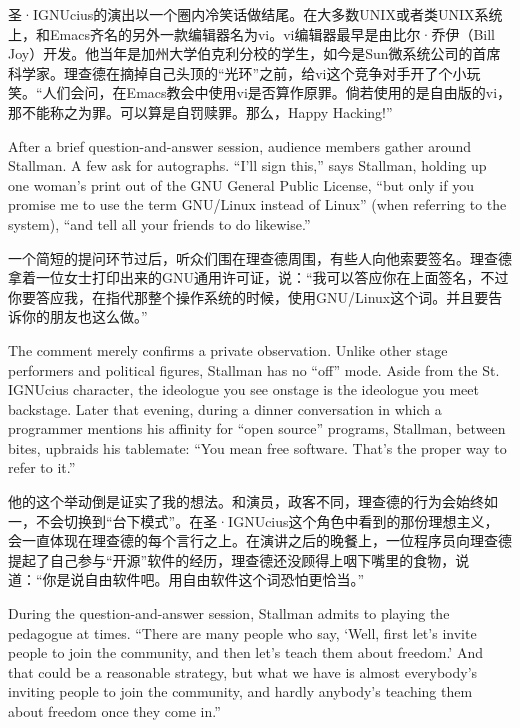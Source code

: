\ifdefined\chs
圣·IGNUcius的演出以一个圈内冷笑话做结尾。在大多数UNIX或者类UNIX系统上，和Emacs齐名的另外一款编辑器名为vi。vi编辑器最早是由比尔·乔伊（Bill Joy）开发。他当年是加州大学伯克利分校的学生，如今是Sun微系统公司的首席科学家。理查德在摘掉自己头顶的``光环''之前，给vi这个竞争对手开了个小玩笑。``人们会问，在Emacs教会中使用vi是否算作原罪。倘若使用的是自由版的vi，那不能称之为罪。可以算是自罚赎罪。那么，Happy Hacking!''
\fi

\ifdefined\eng
After a brief question-and-answer session, audience members gather around Stallman. A few ask for autographs. ``I'll sign this,'' says Stallman, holding up one woman's print out of the GNU General Public License, ``but only if you promise me to use the term GNU/Linux instead of Linux'' (when referring to the system), ``and tell all your friends to do likewise.''
\fi

\ifdefined\chs
一个简短的提问环节过后，听众们围在理查德周围，有些人向他索要签名。理查德拿着一位女士打印出来的GNU通用许可证，说：``我可以答应你在上面签名，不过你要答应我，在指代那整个操作系统的时候，使用GNU/Linux这个词。并且要告诉你的朋友也这么做。''
\fi

\ifdefined\eng
The comment merely confirms a private observation. Unlike other stage performers and political figures, Stallman has no ``off'' mode. Aside from the St. IGNUcius character, the ideologue you see onstage is the ideologue you meet backstage. Later that evening, during a dinner conversation in which a programmer mentions his affinity for ``open source'' programs, Stallman, between bites, upbraids his tablemate: ``You mean free software. That's the proper way to refer to it.''
\fi

\ifdefined\chs
他的这个举动倒是证实了我的想法。和演员，政客不同，理查德的行为会始终如一，不会切换到``台下模式''。在圣·IGNUcius这个角色中看到的那份理想主义，会一直体现在理查德的每个言行之上。在演讲之后的晚餐上，一位程序员向理查德提起了自己参与``开源''软件的经历，理查德还没顾得上咽下嘴里的食物，说道：``你是说自由软件吧。用自由软件这个词恐怕更恰当。''
\fi

\ifdefined\eng
During the question-and-answer session, Stallman admits to playing the pedagogue at times. ``There are many people who say, `Well, first let's invite people to join the community, and then let's teach them about freedom.' And that could be a reasonable strategy, but what we have is almost everybody's inviting people to join the community, and hardly anybody's teaching them about freedom once they come in.''
\fi

